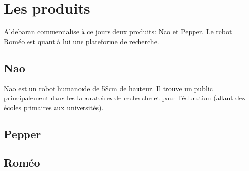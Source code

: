 \section{Les produits}
\label{Entreprise: Les produits}
Aldebaran commercialise à ce jours deux produits: Nao et Pepper. Le robot Roméo est quant à lui une plateforme de recherche. 

\subsection{Nao}
\label{Entreprise: Les produits: Nao}
Nao est un robot humanoïde de 58cm de hauteur. Il trouve un public principalement dans les laboratoires de recherche et pour l'éducation (allant des écoles primaires aux universités).

\subsection{Pepper}
\label{Entreprise: Les produits: Pepper}

\subsection{Roméo}
\label{Entreprise: Les produits: Roméo}


